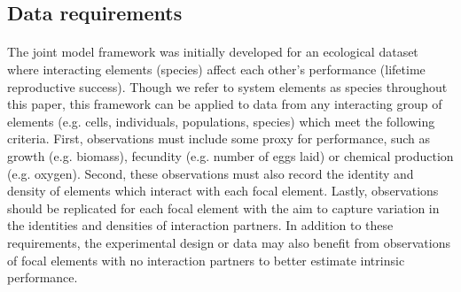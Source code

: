 \documentclass[a4,12pt]{article}
\begin{document}



    \subsection{Data requirements}
    \label{meth:data}

    \paragraph{}
    The joint model framework was initially developed for an ecological dataset where interacting elements (species) affect each other's performance (lifetime reproductive success). Though we refer to system elements as species throughout this paper, this framework can be applied to data from any interacting group of elements (e.g. cells, individuals, populations, species) which meet the following criteria. First, observations must include some proxy for performance, such as growth (e.g. biomass), fecundity (e.g. number of eggs laid) or chemical production (e.g. oxygen). Second, these observations must also record the identity and density of elements which interact with each focal element. Lastly, observations should be replicated for each focal element with the aim to capture variation in the identities and densities of interaction partners. In addition to these requirements, the experimental design or data may also benefit from observations of focal elements with no interaction partners to better estimate intrinsic performance. 
\end{document}
